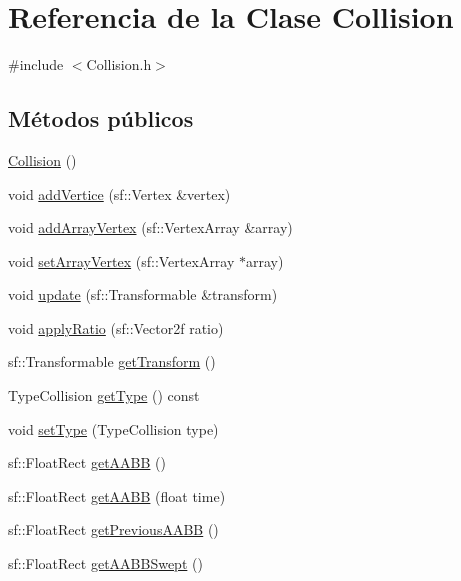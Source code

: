 \hypertarget{classCollision}{}\section{Referencia de la Clase Collision}
\label{classCollision}


{\ttfamily \#include $<$Collision.\+h$>$}

\subsection*{Métodos públicos}
\begin{DoxyCompactItemize}
\item 
\hyperlink{classCollision_aea8004fbf48b79b5db7b784688b23788}{Collision} ()
\item 
void \hyperlink{classCollision_aaf69e6b020eb9fd1cba8aec1d3bb859e}{add\+Vertice} (sf\+::\+Vertex \&vertex)
\item 
void \hyperlink{classCollision_a100a2d80f4163993669c06666255bc57}{add\+Array\+Vertex} (sf\+::\+Vertex\+Array \&array)
\item 
void \hyperlink{classCollision_a95e06a73baa76a87dc51ffca52fcc691}{set\+Array\+Vertex} (sf\+::\+Vertex\+Array $\ast$array)
\item 
void \hyperlink{classCollision_afb02271f321bcfa150098a19a07c8ee8}{update} (sf\+::\+Transformable \&transform)
\item 
void \hyperlink{classCollision_a72b8c24b2a8572c86620a75e048fd29b}{apply\+Ratio} (sf\+::\+Vector2f ratio)
\item 
sf\+::\+Transformable \hyperlink{classCollision_aecb16f7e4fd3e15a20679fedfbbde57d}{get\+Transform} ()
\item 
Type\+Collision \hyperlink{classCollision_a1f943423873c563bae17559933491afd}{get\+Type} () const 
\item 
void \hyperlink{classCollision_a16a681d155544e54068042cb2d97fbd4}{set\+Type} (Type\+Collision type)
\item 
sf\+::\+Float\+Rect \hyperlink{classCollision_af88eea50520b50648a3a6cc56ac81a67}{get\+A\+A\+B\+B} ()
\item 
sf\+::\+Float\+Rect \hyperlink{classCollision_aa0c3873dc05a248348fbe8bacf76213b}{get\+A\+A\+B\+B} (float time)
\item 
sf\+::\+Float\+Rect \hyperlink{classCollision_aa27c1d19aeb0b810be2e8016289d2d67}{get\+Previous\+A\+A\+B\+B} ()
\item 
sf\+::\+Float\+Rect \hyperlink{classCollision_ad650a86d63f7e85436f6df161b9c1857}{get\+A\+A\+B\+B\+Swept} ()
\end{DoxyCompactItemize}
